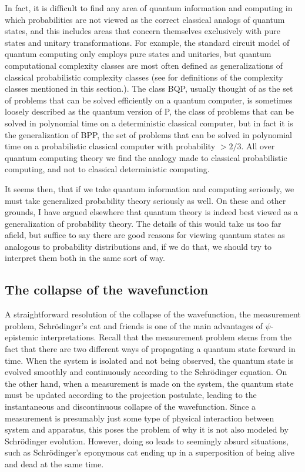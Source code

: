 \documentclass[DIV=calc,paper=a4,fontsize=11pt,twocolumn]{scrartcl} %
\theoremstyle{definition}
\theoremstyle{plain}
\begin{document}
In fact, it is difficult to find any area of quantum information and
computing in which probabilities are not viewed as the correct
classical analogs of quantum states, and this includes areas that
concern themselves exclusively with pure states and unitary
transformations.  For example, the standard circuit model of quantum
computing \cite{Nielsen2000} only employs pure states and unitaries,
but quantum computational complexity classes are most often defined as
generalizations of classical probabilistic complexity classes (see
\cite{Zoo} for definitions of the complexity classes mentioned in this
section.).  The class BQP, usually thought of as the set of problems
that can be solved efficiently on a quantum computer, is sometimes
loosely described as the quantum version of P, the class of problems
that can be solved in polynomial time on a deterministic classical
computer, but in fact it is the generalization of BPP, the set of
problems that can be solved in polynomial time on a probabilistic
classical computer with probability $> 2/3$.  All over quantum
computing theory we find the analogy made to classical probabilistic
computing, and not to classical deterministic computing.

It seems then, that if we take quantum information and computing
seriously, we must take generalized probability theory seriously as
well.  On these and other grounds, I have argued elsewhere
\cite{Leifer2013a, Leifer2013b} that quantum theory is indeed best
viewed as a generalization of probability theory.  The details of this
would take us too far afield, but suffice to say there are good
reasons for viewing quantum states as analogous to probability
distributions and, if we do that, we should try to interpret them both
in the same sort of way.

\subsection{The collapse of the wavefunction}

\label{Collapse}

A straightforward resolution of the collapse of the wavefunction, the
measurement problem, Schr{\"o}dinger's cat and friends is one of the
main advantages of $\psi$-epistemic interpretations.  Recall that the
measurement problem stems from the fact that there are two different
ways of propagating a quantum state forward in time.  When the system
is isolated and not being observed, the quantum state is evolved
smoothly and continuously according to the Schr{\"o}dinger equation.
On the other hand, when a measurement is made on the system, the
quantum state must be updated according to the projection postulate,
leading to the instantaneous and discontinuous collapse of the
wavefunction.  Since a measurement is presumably just some type of
physical interaction between system and apparatus, this poses the
problem of why it is not also modeled by Schr{\"o}dinger evolution.
However, doing so leads to seemingly absurd situations, such as
Schr{\"o}dinger's eponymous cat ending up in a superposition of being
alive and dead at the same time.
\end{document}
